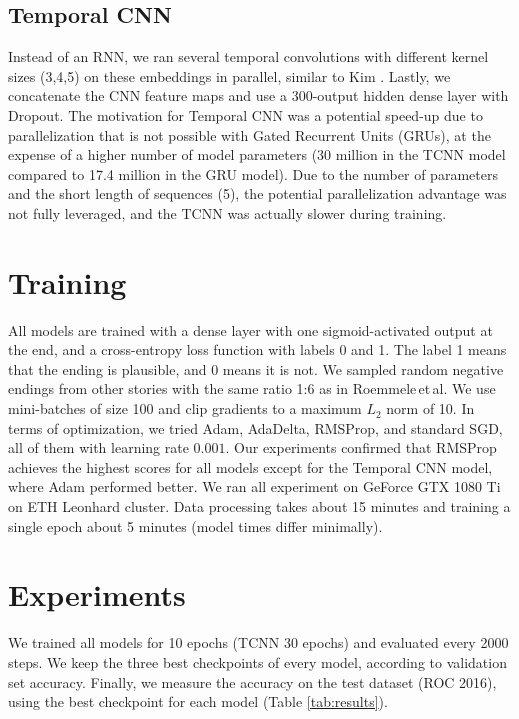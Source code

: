 \documentclass{article}
\begin{document}
\subsection{Temporal CNN}
Instead of an RNN, we ran several temporal convolutions with different kernel sizes (3,4,5) on these embeddings in parallel, similar to Kim \citep{Kim2014ConvolutionalClassification}. Lastly, we concatenate the CNN feature maps and use a 300-output hidden dense layer with Dropout. The motivation for Temporal CNN was a potential speed-up due to parallelization that is not possible with Gated Recurrent Units (GRUs), at the expense of a higher number of model parameters (30 million in the TCNN model compared to 17.4 million in the GRU model). Due to the number of parameters and the short length of sequences (5), the potential parallelization advantage was not fully leveraged, and the TCNN was actually slower during training.



\section{Training}\label{sec:training}
All models are trained with a dense layer with one sigmoid-activated output at the end, and a cross-entropy loss function with labels 0 and 1. The label 1 means that the ending is plausible, and 0 means it is not. We sampled random negative endings from other stories with the same ratio 1:6 as in Roemmele\,et\,al. We use mini-batches of size 100 and clip gradients to a maximum $L_2$ norm of 10. In terms of optimization, we tried Adam, AdaDelta, RMSProp, and standard SGD, all of them with learning rate $0.001$. Our experiments confirmed that RMSProp achieves the highest scores for all models except for the Temporal CNN model, where Adam performed better.
We ran all experiment on GeForce GTX 1080 Ti on ETH Leonhard cluster. Data processing takes about 15 minutes and training a single epoch about 5 minutes (model times differ minimally).

\section{Experiments}\label{sec:experiments}
We trained all models for 10 epochs (TCNN 30 epochs) and evaluated every 2000 steps.
We keep the three best checkpoints of every model, according to validation set accuracy.
Finally, we measure the accuracy on the test dataset (ROC 2016), using the best checkpoint for each model (Table \ref{tab:results}).
\end{document}
